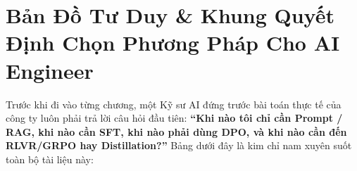 \documentclass[11pt,a4paper,oneside]{report}
\theoremstyle{definition}
\begin{document}
\tableofcontents
\newpage

\chapter*{Bản Đồ Tư Duy \& Khung Quyết Định Chọn Phương Pháp Cho AI Engineer}

Trước khi đi vào từng chương, một Kỹ sư AI đứng trước bài toán thực tế của công ty luôn phải trả lời câu hỏi đầu tiên: \textbf{``Khi nào tôi chỉ cần Prompt / RAG, khi nào cần SFT, khi nào phải dùng DPO, và khi nào cần đến RLVR/GRPO hay Distillation?''} Bảng dưới đây là kim chỉ nam xuyên suốt toàn bộ tài liệu này:
\end{document}
